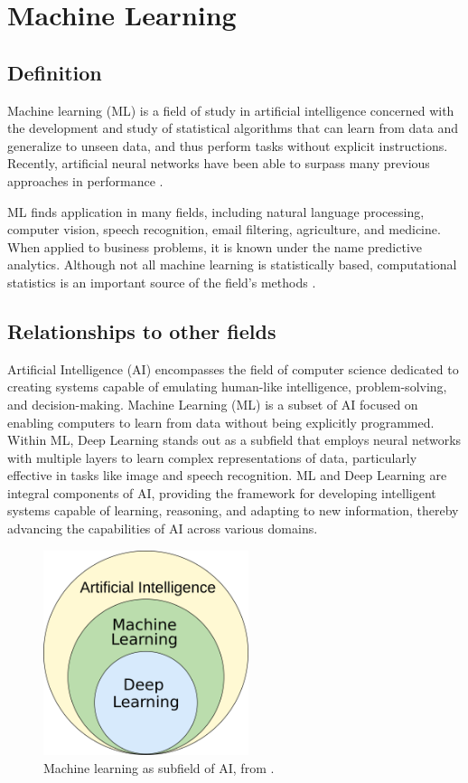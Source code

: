 \section{Machine Learning}

\subsection{Definition}

Machine learning (ML) is a field of study in artificial intelligence concerned with the development and study of statistical algorithms that can learn from data and generalize to unseen data, and thus perform tasks without explicit instructions. Recently, artificial neural networks have been able to surpass many previous approaches in performance .

ML finds application in many fields, including natural language processing, computer vision, speech recognition, email filtering, agriculture, and medicine. When applied to business problems, it is known under the name predictive analytics. Although not all machine learning is statistically based, computational statistics is an important source of the field's methods \cite{enwiki:1220758567}.

\subsection{Relationships to other fields}

Artificial Intelligence (AI) encompasses the field of computer science dedicated to creating systems capable of emulating human-like intelligence, problem-solving, and decision-making. Machine Learning (ML) is a subset of AI focused on enabling computers to learn from data without being explicitly programmed. Within ML, Deep Learning stands out as a subfield that employs neural networks with multiple layers to learn complex representations of data, particularly effective in tasks like image and speech recognition. ML and Deep Learning are integral components of AI, providing the framework for developing intelligent systems capable of learning, reasoning, and adapting to new information, thereby advancing the capabilities of AI across various domains.

\begin{figure}[htpb]
    \centering
    \includegraphics[width=\textwidth,height=6cm,keepaspectratio=true]{ml.png}
    \caption{
        Machine learning as subfield of AI, from \cite{enwiki:1220758567}.
    }
\end{figure}

